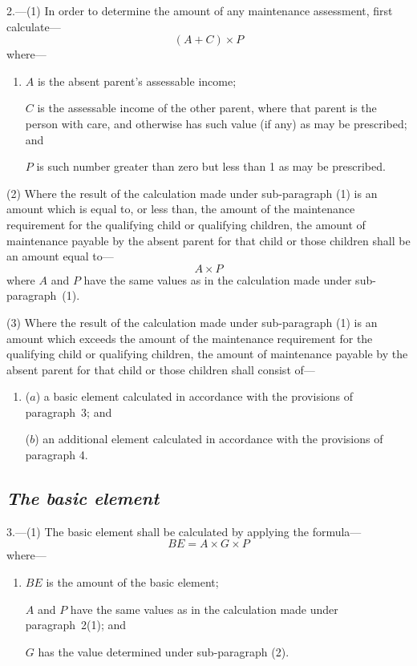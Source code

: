 \documentclass[12pt,a4paper]{article}
\begin{document}
2.---(1) In order to determine the amount of any maintenance assessment, first calculate—
\[
(A + C) \times P
\]
where—
\begin{enumerate}\item[]
    $A$ is the absent parent’s assessable income;

    $C$ is the assessable income of the other parent, where that parent is the person with care, and otherwise has such value (if any) as may be prescribed; and

    $P$ is such number greater than zero but less than 1 as may be prescribed. 
\end{enumerate}

(2) Where the result of the calculation made under sub-paragraph (1)  is an amount which is equal to, or less than, the amount of the maintenance requirement for the qualifying child or qualifying children, the amount of maintenance payable by the absent parent for that child or those children shall be an amount equal to—
\[
A \times P
\]
where $A$ and $P$ have the same values as in the calculation made under sub-paragraph~(1).

(3) Where the result of the calculation made under sub-paragraph (1)  is an amount which exceeds the amount of the maintenance requirement for the qualifying child or qualifying children, the amount of maintenance payable by the absent parent for that child or those children shall consist of—
\begin{enumerate}\item[]
($a$) a basic element calculated in accordance with the provisions of paragraph~3; and

($b$) an additional element calculated in accordance with the provisions of paragraph 4.
\end{enumerate}


\subsection*{\itshape The basic element}

3.---(1) The basic element shall be calculated by applying the formula—
\[
BE = A \times G \times P
\]
where—
\begin{enumerate}\item[]
    $BE$ is the amount of the basic element;

    $A$ and $P$ have the same values as in the calculation made under paragraph~2(1); and

    $G$ has the value determined under sub-paragraph (2). 
\end{enumerate}
\end{document}
